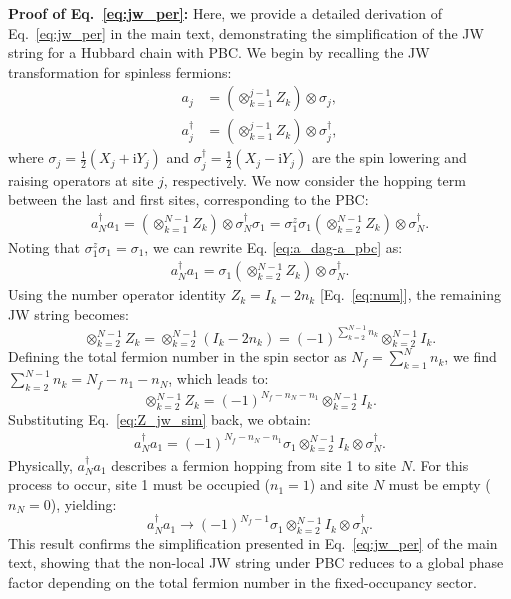 \documentclass[twocolumn,superscriptaddress,amsmath,amssymb,showpacs,floatfix,preprintnumbers]{revtex4-1}
\newcommand{\rmi}{\mathrm{i}}
\begin{document}
\textbf{Proof of Eq.~\eqref{eq:jw_per}:} Here, we provide a detailed derivation of Eq.~\eqref{eq:jw_per} in the main text, demonstrating the simplification of the JW string for a Hubbard chain with PBC.
We begin by recalling the JW transformation for spinless fermions:
\begin{align} \label{eq:JW}
	a_j &= (\otimes_{k=1}^{j-1} Z_k) \otimes  \sigma_j, \\
	a_j^\dagger &= (\otimes_{k=1}^{j-1} Z_k) \otimes \sigma_j^\dagger,
\end{align}
where $\sigma_j = \frac{1}{2}(X_j + \rmi Y_j)$ and $\sigma_j^\dagger = \frac{1}{2}(X_j - \rmi Y_j)$ are the spin lowering and raising operators at site $j$, respectively.
%
We now consider the hopping term between the last and first sites, corresponding to the PBC:
\begin{align} \label{eq:a_dag-a_pbc}
	a_N^\dagger a_1 = \left(\otimes_{k=1}^{N-1} Z_k\right) \otimes \sigma_N^\dagger \sigma_1 = \sigma_1^z \sigma_1 \left(\otimes_{k=2}^{N-1} Z_k\right) \otimes \sigma_N^\dagger.
\end{align}
%
Noting that $\sigma_1^z \sigma_1 = \sigma_1$, we can rewrite Eq. \eqref{eq:a_dag-a_pbc} as:
\begin{align}
	a_N^\dagger a_1 = \sigma_1 \left(\otimes_{k=2}^{N-1} Z_k\right) \otimes \sigma_N^\dagger.
\end{align}
%
Using the number operator identity $Z_k = I_k - 2n_k$ [Eq.\ \eqref{eq:num}], the remaining JW string becomes:
\begin{equation}
	\otimes_{k=2}^{N-1} Z_k = \otimes_{k=2}^{N-1} ( I_k - 2n_k)
	= (-1)^{\sum_{k=2}^{N-1} n_k} \otimes_{k=2}^{N-1} I_k.
\end{equation}
%
Defining the total fermion number in the spin sector as $N_f = \sum_{k=1}^N n_k$, we find
$\sum_{k=2}^{N-1} n_k = N_f - n_1 - n_N$, which leads to:
\begin{equation}  \label{eq:Z_jw_sim}
	\otimes_{k=2}^{N-1} Z_k
	= (-1)^{N_f - n_N -n_1} \otimes_{k=2}^{N-1} I_k.
\end{equation}
%	
Substituting Eq.~\eqref{eq:Z_jw_sim} back, we obtain:
\begin{align} 
	a_N^\dagger a_1 =  (-1)^{N_f - n_N -n_1} \sigma_1 \otimes_{k=2}^{N-1} I_k \otimes \sigma_N^\dagger.
\end{align}
%
Physically, $a_N^\dagger a_1$ describes a fermion hopping from site 1 to site $N$. 
%
For this process to occur, site 1 must be occupied ($n_1 = 1$) and site $N$ must be empty 
($n_N = 0$), yielding:
\begin{equation}
	a_N^\dagger a_1 \rightarrow (-1)^{N_f-1}  \sigma_1 \otimes_{k=2}^{N-1} I_k 
	\otimes \sigma_N^\dagger.
\end{equation}
%
This result confirms the simplification presented in Eq.~\eqref{eq:jw_per} of the main text, showing that the non-local JW string under PBC reduces to a global phase factor depending on the total fermion number in the fixed-occupancy sector.
\\
\end{document}
